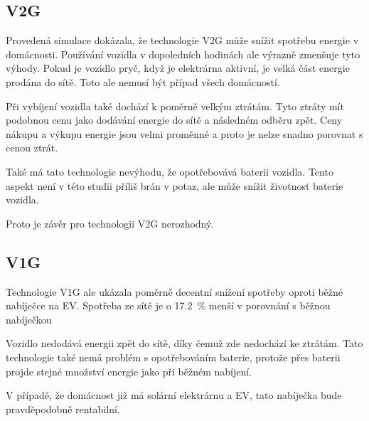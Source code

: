 \documentclass[12pt,a4paper]{article}
\begin{document}
\subsection{V2G}

Provedená simulace dokázala, že technologie V2G může snížit spotřebu energie v domácnosti.
Používání vozidla v dopoledních hodinách ale výrazně zmenšuje tyto výhody.
Pokud je vozidlo pryč, když je elektrárna aktivní, je velká část energie prodána do sítě.
Toto ale nemusí být případ všech domácností.

Při vybíjení vozidla také dochází k poměrně velkým ztrátám.
Tyto ztráty mít podobnou cenu jako dodávání energie do sítě a následném odběru zpět.
Ceny nákupu a výkupu energie jsou velmi proměnné a proto je nelze snadno porovnat s cenou ztrát.

Také má tato technologie nevýhodu, že opotřebovává baterii vozidla.
Tento aspekt není v této studii příliš brán v potaz, ale může snížit životnost baterie vozidla.

Proto je závěr pro technologii V2G nerozhodný.

\subsection{V1G}

Technologie V1G ale ukázala poměrně decentní snížení spotřeby oproti běžné nabíječce na EV.
Spotřeba ze sítě je o 17.2~\% menší v porovnání s běžnou nabíječkou

Vozidlo nedodává energii zpět do sítě, díky čemuž zde nedochází ke ztrátám.
Tato technologie také nemá problém s opotřebováním baterie,
protože přes baterii projde stejné množství energie jako při běžném nabíjení.

V případě, že domácnost již má solární elektrárnu a EV,
tato nabíječka bude pravděpodobně rentabilní.

\newpage

\printbibliography
\end{document}
